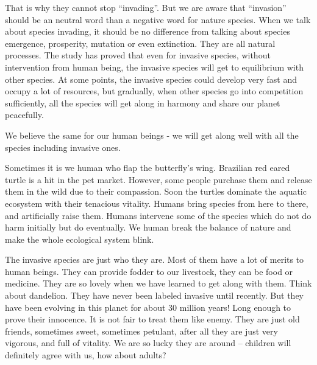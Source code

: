 \documentclass[12pt]{article}
\begin{document}
That is why they cannot stop ``invading''.  But we are aware that ``invasion'' should be an neutral word than a negative word for nature species.  When we talk about species invading, it should be no difference from talking about species emergence, prosperity, mutation or even extinction.  They are all natural processes.  The study has proved that even for invasive species, without intervention from human being, the invasive species will get to equilibrium with other species.  At some points, the invasive species could develop very fast and occupy a lot of resources, but gradually, when other species go into competition sufficiently, all the species will get along in harmony and share our planet peacefully.

We believe the same for our human beings - we will get along well with all the species including invasive ones.

Sometimes it is we human who flap the butterfly's wing.  Brazilian red eared turtle is a hit in the pet market. However, some people purchase them and release them in the wild due to their compassion. Soon the turtles dominate the aquatic ecosystem with their tenacious vitality.  Humans bring species from here to there, and artificially raise them.  Humans intervene some of the species which do not do harm initially but do eventually.  We human break the balance of nature and make the whole ecological system blink.

The invasive species are just who they are.  Most of them have a lot of merits to human beings.  They can provide fodder to our livestock, they can be food or medicine.  They are so lovely when we have learned to get along with them.  Think about dandelion.  They have never been labeled invasive until recently.  But they have been evolving in this planet for about 30 million years! Long enough to prove their innocence.  It is not fair to treat them like enemy.  They are just old friends, sometimes sweet, sometimes petulant, after all they are just very vigorous, and full of vitality.  We are so lucky they are around -- children will definitely agree with us, how about adults?







\newpage
\newrefcontext
\printbibliography
\end{document}
